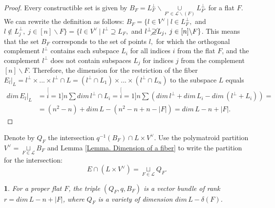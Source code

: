 \documentclass[11pt]{article}
\theoremstyle{plain}
\theoremstyle{definition}
\theoremstyle{remark}
\theoremstyle{plain}
\theoremstyle{plain}
\newtheorem{prop}[thm]{\protect\propositionname}
\theoremstyle{plain}
\theoremstyle{definition}
\providecommand{\propositionname}{Proposition}
\begin{document}
\begin{proof}
Every constructible set is given by $B_{F}=L_{F}^{\perp}\backslash\underset{F'\in\mathcal{L}\backslash(F)}{\cup}L_{F'}^{\perp}$
for a flat $F$. We can rewrite the definition as follows: $B_{F}=\{l\in V^{\vee}\,|\;l\in L_{F}^{\perp},$
and $l\notin L_{j}^{\perp},\;j\in[n]\backslash F\}=\{l\in V^{\vee}\,|\;l^{\perp}\supseteq L_{F},$
and $l^{\perp}\cancel{\supseteq}L_{j},\;j\in[n]\backslash F\}$. This
means that the set $B_{F}$ corresponds to the set of points $l,$
for which the orthogonal complement $l^{\perp}$ contains each subspace
$L_{i}$ for all indices $i$ from the flat $F$, and the complement
$l^{\perp}$ does not contain subspaces $L_{j}$ for indices $j$
from the complement $[n]\backslash F$. Therefore, the dimension for
the restriction of the fiber $E_{l}|_{L}=l^{\perp}\times...\times l^{\perp}\cap L=(l^{\perp}\cap L_{1})\times...\times(l^{\perp}\cap L_{n})$
to the subspace $L$ equals 
\begin{align*}
dim\,E_{l}|_{L} & =\stackrel[i=1]{n}{\sum}dim\,l^{\perp}\cap L_{i}=\stackrel[i=1]{n}{\sum}(dim\,l^{\perp}+dim\,L_{i}-dim\,(l^{\perp}+L_{i}))=\\
 & =(n^{2}-n)+dim\,L-(n^{2}-n+n-|F|)=dim\,L-n+|F|.
\end{align*}
\end{proof}
Denote by $Q_{F}$ the intersection $q^{-1}(B_{F})\cap L\times V^{\vee}$.
Use the polymatroid partition $V^{\vee}=\underset{F\in\mathcal{L}}{\sqcup}B_{F}$
and Lemma \ref{Lemma. Dimension of a fiber} to write the partition
for the intersection:
\[
E\cap(L\times V^{\vee})=\underset{F\in\mathcal{L}}{\sqcup}Q_{F}.
\]

\begin{prop}
\label{Proposition. Vector bundles other B_F}For a proper flat $F$,
the triple $(Q_{F},q,B_{F})$ is a vector bundle of rank $r=dim\,L-n+|F|$,
where $Q_{F}$ is a variety of dimension $dim\,L-\delta(F)$.
\end{prop}
\end{document}
